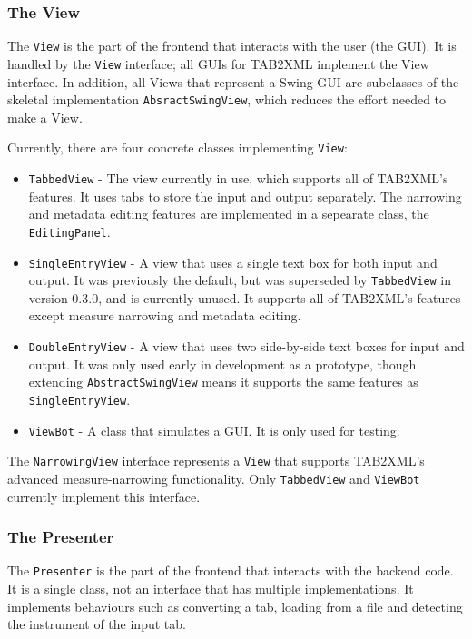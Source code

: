\documentclass[11pt]{article}
\begin{document}
\subsubsection{The View}
\label{sec:org7f1663d}
The \texttt{View} is the part of the frontend that interacts with the user (the GUI).  It is handled by the \texttt{View} interface; all GUIs for TAB2XML implement the View interface.  In addition, all Views that represent a Swing GUI are subclasses of the skeletal implementation \texttt{AbsractSwingView}, which reduces the effort needed to make a View.

Currently, there are four concrete classes implementing \texttt{View}:
\begin{itemize}
\item \texttt{TabbedView} - The view currently in use, which supports all of TAB2XML's features.  It uses tabs to store the input and output separately.  The narrowing and metadata editing features are implemented in a sepearate class, the \texttt{EditingPanel}.
\item \texttt{SingleEntryView} - A view that uses a single text box for both input and output.  It was previously the default, but was superseded by \texttt{TabbedView} in version 0.3.0, and is currently unused.  It supports all of TAB2XML's features except measure narrowing and metadata editing.
\item \texttt{DoubleEntryView} - A view that uses two side-by-side text boxes for input and output.  It was only used early in development as a prototype, though extending \texttt{AbstractSwingView} means it supports the same features as \texttt{SingleEntryView}.
\item \texttt{ViewBot} - A class that simulates a GUI.  It is only used for testing.
\end{itemize}

The \texttt{NarrowingView} interface represents a \texttt{View} that supports TAB2XML's advanced measure-narrowing functionality.  Only \texttt{TabbedView} and \texttt{ViewBot} currently implement this interface.
\subsubsection{The Presenter}
\label{sec:org4d5aaed}
The \texttt{Presenter} is the part of the frontend that interacts with the backend code.  It is a single class, not an interface that has multiple implementations.  It implements behaviours such as converting a tab, loading from a file and detecting the instrument of the input tab.
\end{document}
